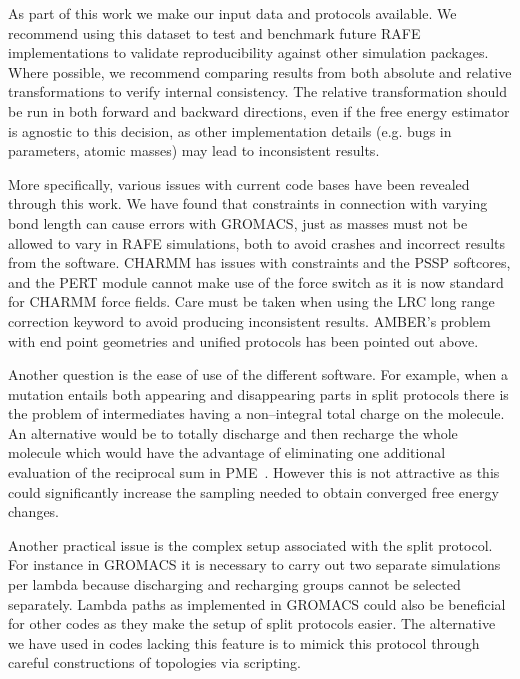 \documentclass[journal=jctcce,manuscript=article]{achemso}
\begin{document}
As part of this work we make our input data and protocols available.  We recommend using this dataset to test and benchmark future RAFE implementations to validate reproducibility against other simulation packages.
Where possible, we recommend comparing results from both absolute and relative transformations to verify internal consistency.
The relative transformation should be run in both forward and backward directions, even if the free energy estimator is agnostic to this decision, as other implementation details (e.g. bugs in parameters, atomic masses) may lead to inconsistent results.

More specifically, various issues with current code bases have been revealed through this work.
We have found that constraints in connection with varying bond length can cause errors with GROMACS, just as masses must not be allowed to vary in RAFE simulations, both to avoid crashes and incorrect results from the
software.  CHARMM has issues with constraints and the PSSP softcores, and the PERT module cannot make use of the force switch as it is now standard for CHARMM force fields. Care must be taken when using the LRC long range correction keyword to avoid producing inconsistent results.  AMBER's problem with end point geometries and unified protocols has been pointed out above.

Another question is the ease of use of the different software.  For example, when a mutation entails both appearing and disappearing parts in split
protocols there is the problem of intermediates having a non--integral total
charge on the molecule.  An alternative would be to totally discharge and then
recharge the whole molecule which
would have the advantage of eliminating one additional evaluation of the reciprocal sum in PME~\cite{doi:10.1021/ct400340s}.
 However this is not attractive as this could significantly increase the sampling needed to obtain converged free energy changes.

 Another practical issue is the complex setup associated with the
 split protocol. For instance in GROMACS it is necessary to carry out two separate simulations per lambda because discharging and recharging groups cannot be selected separately.
Lambda paths as implemented in GROMACS could also be beneficial for other codes as they make the setup of split protocols easier.  The alternative we have used in codes lacking this feature is to mimick this protocol through careful constructions of
topologies via scripting.
\end{document}
